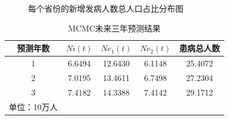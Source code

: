 \documentclass[12pt,twoside,UTF8]{ctexart}
\theoremstyle{nonumberplain}
\newcommand{\wuhao}{\fontsize{10.5pt}{\baselineskip}\selectfont}
\begin{document}
\begin{figure}[H]%
  \centering
    \hspace{0in}
  \caption{\heiti  每个省份的新增发病人数总人口占比分布图}
  \label{f2}
\end{figure}


\begin{table}[H]%
  \wuhao 
  \label{t1} 
  \tabcolsep 1mm 
  \caption{\heiti MCMC未来三年预测结果}
  \centering
    \begin{tabular}{ccccc}
    \Xhline{0.8pt}
      预测年数 & $Ni(t)$ & $Ne_1(t)$ & $Ne_2(t)$ & 患病总人数\\
    \hline
	1      & 6.6494  & 12.6430   & 6.1148    & 25.4072\\
	2      & 7.0195  & 13.4611   & 6.7498    & 27.2304\\
	3      & 7.4182  & 14.3388   & 7.4142    & 29.1712\\
    \Xhline{0.8pt}
    {\wuhao *单位：10万人}\\
    \end{tabular} 
\end{table}

\end{document}
